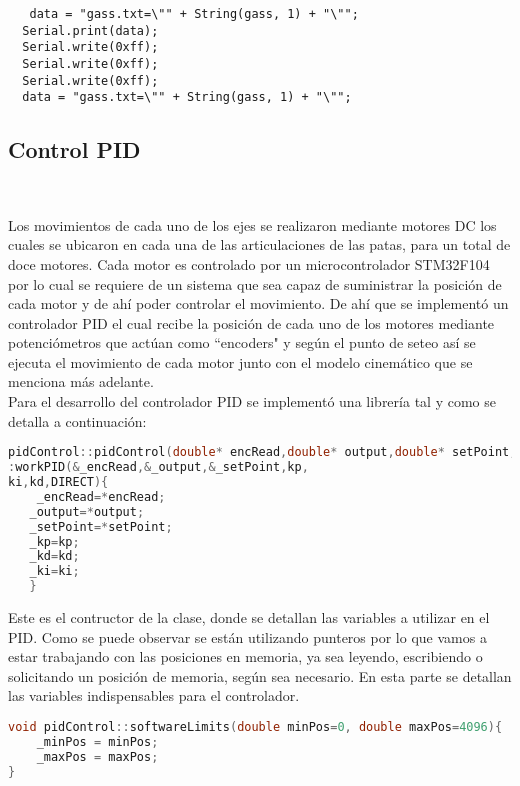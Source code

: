 \documentclass[12pt,letterpaper]{IEEEtran}
\begin{document}
  \begin{lstlisting}
   data = "gass.txt=\"" + String(gass, 1) + "\"";
  Serial.print(data);
  Serial.write(0xff);
  Serial.write(0xff);
  Serial.write(0xff);
  data = "gass.txt=\"" + String(gass, 1) + "\"";
  \end{lstlisting}
  
\subsection{Control PID}\

Los movimientos de cada uno de los ejes se realizaron mediante motores DC los cuales se ubicaron en cada una de las articulaciones de las patas, para un total de doce motores. Cada motor es controlado por un microcontrolador STM32F104 por lo cual se requiere de un sistema que sea capaz de suministrar la posición de cada motor y de ahí poder controlar el movimiento.
De ahí que se implementó un controlador PID el cual recibe la posición de cada uno de los motores mediante potenciómetros que actúan como ``encoders" y según el punto de seteo así se ejecuta el movimiento de cada motor junto con el modelo cinemático que se menciona más adelante.\\

Para el desarrollo del controlador PID se implementó una librería tal y como se detalla a continuación:\\

\begin{lstlisting}[language = c++]
pidControl::pidControl(double* encRead,double* output,double* setPoint,double kp,double kd,double ki)  
:workPID(&_encRead,&_output,&_setPoint,kp,
ki,kd,DIRECT){
	_encRead=*encRead;
   _output=*output;
   _setPoint=*setPoint;
   _kp=kp;
   _kd=kd;
   _ki=ki;
   }
\end{lstlisting}

Este es el contructor de la clase, donde se detallan las variables a utilizar en el PID. Como se puede observar se están utilizando punteros por lo que vamos a estar trabajando con las posiciones en memoria, ya sea leyendo, escribiendo o solicitando un posición de memoria, según sea necesario.
En esta parte se detallan las variables indispensables para el controlador.

\begin{lstlisting}[language=c++]
void pidControl::softwareLimits(double minPos=0, double maxPos=4096){
	_minPos = minPos;
	_maxPos = maxPos;
}
\end{lstlisting}
\end{document}

